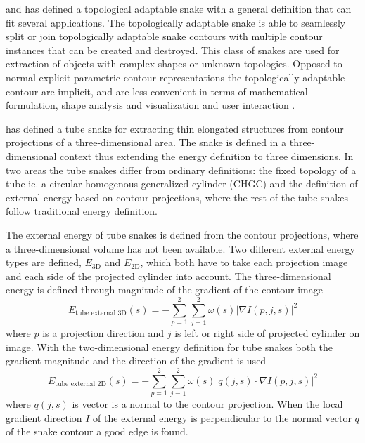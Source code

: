 \citet{mcinerney95} and \citet{mcinerney97} has defined a topological
adaptable snake with a general definition that can fit several
applications. The topologically adaptable snake is able to seamlessly
split or join topologically adaptable snake contours with multiple
contour instances that can be created and destroyed. This class of
snakes are used for extraction of objects with complex shapes or
unknown topologies. Opposed to normal explicit parametric contour
representations the topologically adaptable contour are implicit, and
are less convenient in terms of mathematical formulation, shape
analysis and visualization and user interaction \citep{mcinerney95}.


\citet{mogensen99} has defined a tube snake for extracting thin
elongated structures from contour projections of a three-dimensional
area. The snake is defined in a three-dimensional context thus
extending the energy definition to three dimensions. In two areas the
tube snakes differ from ordinary definitions: the fixed topology of a
tube ie. a circular homogenous generalized cylinder (CHGC) and the
definition of external energy based on contour projections, where the
rest of the tube snakes follow traditional energy definition.


The external energy of tube snakes is defined from the contour
projections, where a three-dimensional volume has not been available.
Two different external energy types are defined, $E_{\text{3D}}$ and
$E_{\text{2D}}$, which both have to take each projection image and
each side of the projected cylinder into account. The
three-dimensional energy is defined through magnitude of the gradient
of the contour image
\begin{equation}
  \nonumber
  E_{\text{tube external 3D}}(s) = - \sum^2_{p=1} \sum^2_{j=1} \omega(s) \lvert\nabla I(p,j,s) \rvert^2
\end{equation}
where $p$ is a projection direction and $j$ is left or right side of
projected cylinder on image. With the two-dimensional energy
definition for tube snakes both the gradient magnitude and the
direction of the gradient is used
\begin{equation}
  \nonumber
  E_{\text{tube external 2D}}(s) = - \sum^2_{p=1} \sum^2_{j=1} \omega(s) \lvert q(j,s) \cdot \nabla I(p,j,s)\rvert^2
\end{equation}
where $q(j,s)$ is vector is a normal to the contour projection. When
the local gradient direction $I$ of the external energy is
perpendicular to the normal vector $q$ of the snake contour a good
edge is found.


